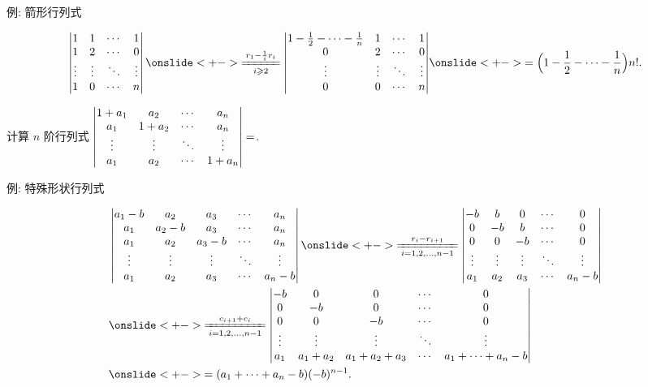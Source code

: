 \begin{frame}{例: 箭形行列式}
	\onslide<+->
	\begin{example}
		\[\detm{
			1&1&\cdots&1\\
			1&2&\cdots&0\\
			\vdots&\vdots&\ddots&\vdots\\
			1&0&\cdots&n
		}\onslide<+->{\xeq[i\ge 2]{r_1-\frac1i r_i}
		\detm{
			1-\frac12-\cdots-\frac1n&1&\cdots&1\\
			0&2&\cdots&0\\
			\vdots&\vdots&\ddots&\vdots\\
			0&0&\cdots&n
		}}
		\onslide<+->{=\Bigl(1-\frac12-\cdots-\frac1n\Bigr)n!.}\]
	\end{example}
	\onslide<+->
	\begin{exercise}
		计算 $n$ 阶行列式 $\left|\begin{matrix}
			1+a_1&a_2&\cdots&a_n\\
			a_1&1+a_2&\cdots&a_n\\
			\vdots&\vdots&\ddots&\vdots\\
			a_1&a_2&\cdots&1+a_n
		\end{matrix}\right|=$.
	\end{exercise}
\end{frame}


\begin{frame}{例: 特殊形状行列式}
	\onslide<+->
	\begin{example}
		\begin{align*}
		&\detm{
			a_1-b&a_2&a_3&\cdots&a_n\\
			a_1&a_2-b&a_3&\cdots&a_n\\
			a_1&a_2&a_3-b&\cdots&a_n\\
			\vdots&\vdots&\vdots&\ddots&\vdots\\
			a_1&a_2&a_3&\cdots&a_n-b
		}\onslide<+->{\xeq[i=1,2,\dots,n-1]{r_i-r_{i+1}}
		\detm{
			-b& b& 0&\cdots&0\\
			 0&-b& b&\cdots&0\\
			 0& 0&-b&\cdots&0\\
			\vdots&\vdots&\vdots&\ddots&\vdots\\
			a_1&a_2&a_3&\cdots&a_n-b
		}}\\
		&\onslide<+->{\xeq[i=1,2,\dots,n-1]{c_{i+1}+c_i}
		\detm{
			-b& 0& 0&\cdots&0\\
			 0&-b& 0&\cdots&0\\
			 0& 0&-b&\cdots&0\\
			\vdots&\vdots&\vdots&\ddots&\vdots\\
			a_1&a_1+a_2&a_1+a_2+a_3&\cdots&a_1+\cdots+a_n-b
		}}\\
		&\onslide<+->{=(a_1+\cdots+a_n-b)(-b)^{n-1}.}
	\end{align*}
	\end{example}
\end{frame}


